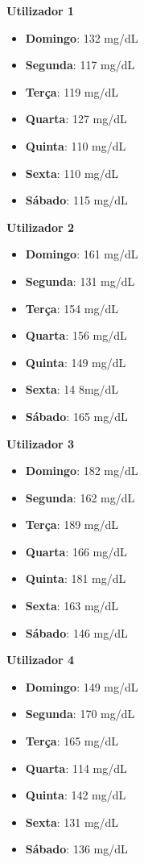 \textbf{Utilizador 1}

\begin{itemize}[noitemsep]
\item \textbf{Domingo}: 132 mg/dL
\item \textbf{Segunda}: 117 mg/dL
\item \textbf{Terça}: 119 mg/dL
\item \textbf{Quarta}: 127 mg/dL
\item \textbf{Quinta}: 110 mg/dL
\item \textbf{Sexta}: 110 mg/dL
\item \textbf{Sábado}: 115 mg/dL
\end{itemize}


\textbf{Utilizador 2}

\begin{itemize}[noitemsep]
\item \textbf{Domingo}: 161 mg/dL
\item \textbf{Segunda}: 131 mg/dL
\item \textbf{Terça}: 154 mg/dL
\item \textbf{Quarta}: 156 mg/dL
\item \textbf{Quinta}: 149 mg/dL
\item \textbf{Sexta}: 14 8mg/dL
\item \textbf{Sábado}: 165 mg/dL
\end{itemize}

\textbf{Utilizador 3}

\begin{itemize}[noitemsep]
\item \textbf{Domingo}: 182 mg/dL
\item \textbf{Segunda}: 162 mg/dL
\item \textbf{Terça}: 189 mg/dL
\item \textbf{Quarta}: 166 mg/dL
\item \textbf{Quinta}: 181 mg/dL
\item \textbf{Sexta}: 163 mg/dL
\item \textbf{Sábado}: 146 mg/dL
\end{itemize}


\textbf{Utilizador 4}

\begin{itemize}[noitemsep]
\item \textbf{Domingo}: 149 mg/dL
\item \textbf{Segunda}: 170 mg/dL
\item \textbf{Terça}: 165 mg/dL
\item \textbf{Quarta}: 114 mg/dL
\item \textbf{Quinta}: 142 mg/dL
\item \textbf{Sexta}: 131 mg/dL
\item \textbf{Sábado}: 136 mg/dL
\end{itemize}


